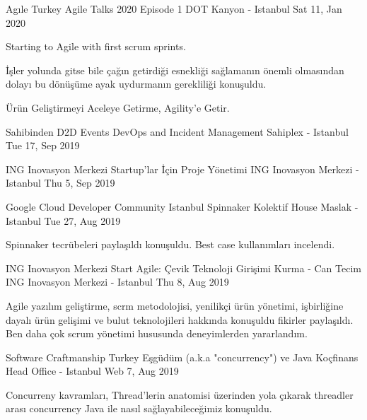 \begin{cventries}
    \cventry
    {Agıle Turkey}
    {Agile Talks 2020 Episode 1}
    {DOT Kanyon - Istanbul}
    {Sat 11, Jan 2020}
    {
      \begin{cvitems}
        \item{Starting to Agile with first scrum sprints.}
        \item{İşler yolunda gitse bile çağın getirdiği esnekliği sağlamanın önemli olmasından dolayı bu dönüşüme ayak uydurmanın gerekliliği konuşuldu.}
        \item{Ürün Geliştirmeyi Aceleye Getirme, Agility'e Getir.}
      \end{cvitems}
    }

    \cventry
    {Sahibinden D2D Events}
    {DevOps and Incident Management}
    {Sahiplex - Istanbul}
    {Tue 17, Sep 2019}
    {
      \begin{cvitems}
      \end{cvitems}
    }
    
    \cventry
    {ING Inovasyon Merkezi}
    {Startup'lar İçin Proje Yönetimi}
    {ING Inovasyon Merkezi - Istanbul}
    {Thu 5, Sep 2019}
    {
      \begin{cvitems}
      \end{cvitems}
    }
    
    \cventry
    {Google Cloud Developer Community Istanbul}
    {Spinnaker}
    {Kolektif House Maslak - Istanbul}
    {Tue 27, Aug 2019}
    {
      \begin{cvitems}
        \item{Spinnaker tecrübeleri paylaşıldı konuşuldu. Best case kullanımları incelendi.}
      \end{cvitems}
    }
    
    \cventry
    {ING Inovasyon Merkezi}
    {Start Agile: Çevik Teknoloji Girişimi Kurma - Can Tecim}
    {ING Inovasyon Merkezi - Istanbul}
    {Thu 8, Aug 2019}
    {
      \begin{cvitems}
        \item{Agile yazılım geliştirme, scrm metodolojisi, yenilikçi ürün yönetimi, işbirliğine dayalı ürün gelişimi ve bulut teknolojileri hakkında konuşuldu fikirler paylaşıldı. Ben daha çok scrum yönetimi hususunda deneyimlerden yararlandım.}
      \end{cvitems}
    }
    
    \cventry
    {Software Craftmanship Turkey}
    {Eşgüdüm (a.k.a "concurrency") ve Java}
    {Koçfinans Head Office - Istanbul}
    {Web 7, Aug 2019}
    {
      \begin{cvitems}
        \item{Concurreny kavramları, Thread'lerin anatomisi üzerinden yola çıkarak threadler arası concurrency Java ile nasıl sağlayabileceğimiz konuşuldu.}
      \end{cvitems}
    }
    

\end{cventries}
